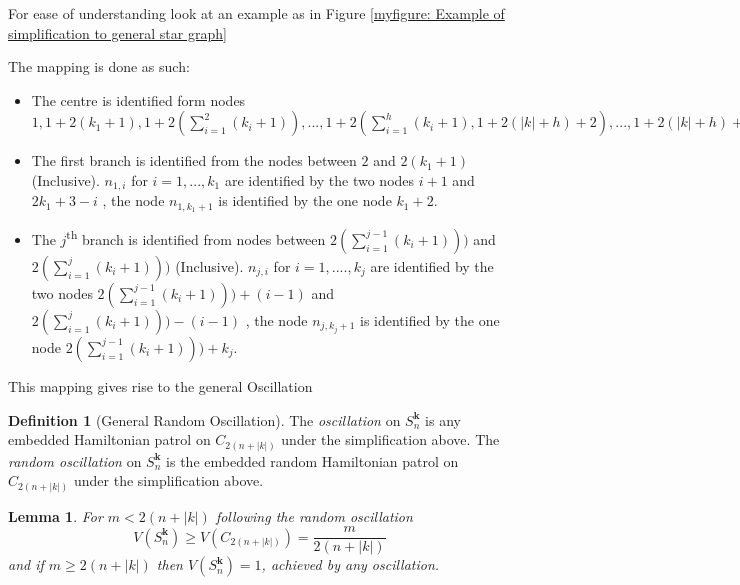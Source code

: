\documentclass[a4paper,10pt]{article}
\newtheorem{lemma}[theorem]{Lemma}
\theoremstyle{definition}
\newtheorem{definition}[theorem]{Definition}
\theoremstyle{definition}
\theoremstyle{remark}
\theoremstyle{definition}
\begin{document}
For ease of understanding look at an example as in Figure \ref{myfigure: Example of simplification to general star graph}

The mapping is done as such:
\begin{itemize}
\item The centre is identified form nodes $1,1+2(k_{1}+1),1+2(\sum\limits_{i=1}^{2} (k_{i}+1)),...,1+2(\sum\limits_{i=1}^{h}(k_{i}+1),1+2(|k|+h)+2),...,1+2(|k|+h)+2(n-h)$

\item The first branch is identified from the nodes between $2$ and $2(k_{1}+1)$ (Inclusive). $n_{1,i}$ for $i=1,...,k_{1}$ are identified by the two nodes $i+1$ and $2k_{1}+3-i$ , the node $n_{1,k_{1}+1}$ is identified by the one node $k_{1}+2$.

\item The $j$\textsuperscript{th} branch is identified from nodes between $2(\sum\limits_{i=1}^{j-1} (k_{i}+1)))$ and $2(\sum\limits_{i=1}^{j} (k_{i}+1)))$ (Inclusive). $n_{j,i}$ for $i=1,....,k_{j}$ are identified by the two nodes $2(\sum\limits_{i=1}^{j-1} (k_{i}+1)))+(i-1)$ and $2(\sum\limits_{i=1}^{j} (k_{i}+1)))-(i-1)$ , the node $n_{j,k_{j}+1}$ is identified by the one node $2(\sum\limits_{i=1}^{j-1} (k_{i}+1)))+k_{j}$.
\end{itemize}

This mapping gives rise to the general Oscillation

\begin{definition}[General Random Oscillation]
The \textit{oscillation} on $S^{\bm{k}}_{n}$ is any embedded Hamiltonian patrol on $C_{2(n+|k|)}$ under the simplification above. The \textit{random oscillation} on $S^{\bm{k}}_{n}$ is the embedded random Hamiltonian patrol on $C_{2(n+|k|)}$ under the simplification above.
\end{definition}

\begin{lemma}
For $m < 2(n+|k|)$ following the random oscillation
$$V(S^{\bm{k}}_{n}) \geq V(C_{2(n+|k|)})=\frac{m}{2(n+|k|)}$$
and if $m \geq 2(n+|k|)$ then $V(S^{\bm{k}}_{n})=1$, achieved by any oscillation. 
\end{lemma}
\end{document}
